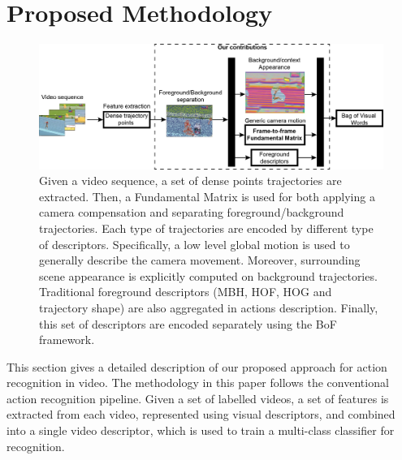 \section{Proposed Methodology} \label{scene}

\begin{figure}[t!]
\begin{center}
\includegraphics[width=0.98\linewidth]{fig/pipeline.png}
\end{center}
\caption{Given a video sequence, a set of dense points trajectories are extracted. Then, a Fundamental Matrix is used for both applying a camera compensation and separating foreground/background trajectories. Each type of trajectories are encoded by different type of descriptors. Specifically, a low level global motion is used to generally describe the camera movement. Moreover, surrounding scene appearance is explicitly computed on background trajectories. Traditional foreground descriptors (\eg MBH, HOF, HOG and trajectory shape) are also aggregated in actions description. Finally, this set of descriptors are encoded separately using the BoF framework.}
\label{fig:pipeline}
\end{figure}

This section gives a detailed description of our proposed approach for action recognition in video. The methodology in this paper follows the conventional action recognition pipeline. Given a set of labelled videos, a set of features is extracted from each video, represented using visual descriptors, and combined into a single video descriptor, which is used to train a multi-class classifier for recognition.


